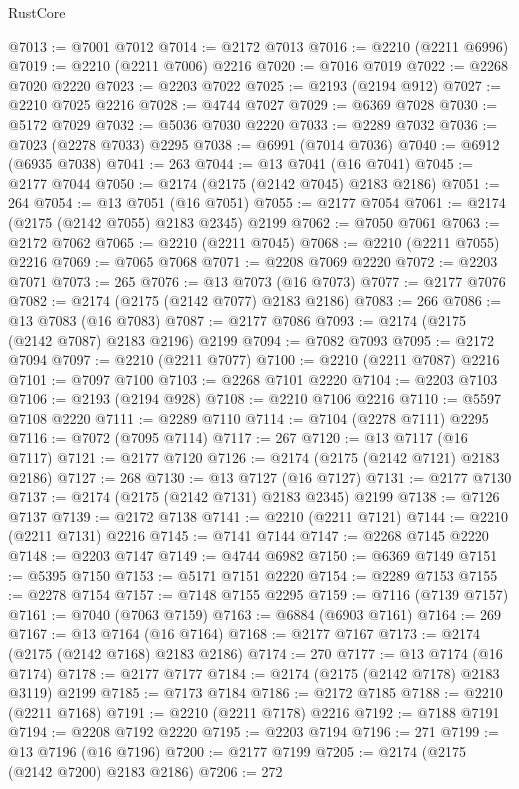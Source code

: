 \begin{lexlean}{RustCore}
\begin{coremodule}
@7013 := @7001 @7012
@7014 := @2172 @7013
@7016 := @2210 (@2211 @6996)
@7019 := @2210 (@2211 @7006) @2216
@7020 := @7016 @7019
@7022 := @2268 @7020 @2220
@7023 := @2203 @7022
@7025 := @2193 (@2194 @912)
@7027 := @2210 @7025 @2216
@7028 := @4744 @7027
@7029 := @6369 @7028
@7030 := @5172 @7029
@7032 := @5036 @7030 @2220
@7033 := @2289 @7032
@7036 := @7023 (@2278 @7033) @2295
@7038 := @6991 (@7014 @7036)
@7040 := @6912 (@6935 @7038)
@7041 := 263
@7044 := @13 @7041 (@16 @7041)
@7045 := @2177 @7044
@7050 := @2174 (@2175 (@2142 @7045) @2183 @2186)
@7051 := 264
@7054 := @13 @7051 (@16 @7051)
@7055 := @2177 @7054
@7061 := @2174 (@2175 (@2142 @7055) @2183 @2345) @2199
@7062 := @7050 @7061
@7063 := @2172 @7062
@7065 := @2210 (@2211 @7045)
@7068 := @2210 (@2211 @7055) @2216
@7069 := @7065 @7068
@7071 := @2208 @7069 @2220
@7072 := @2203 @7071
@7073 := 265
@7076 := @13 @7073 (@16 @7073)
@7077 := @2177 @7076
@7082 := @2174 (@2175 (@2142 @7077) @2183 @2186)
@7083 := 266
@7086 := @13 @7083 (@16 @7083)
@7087 := @2177 @7086
@7093 := @2174 (@2175 (@2142 @7087) @2183 @2196) @2199
@7094 := @7082 @7093
@7095 := @2172 @7094
@7097 := @2210 (@2211 @7077)
@7100 := @2210 (@2211 @7087) @2216
@7101 := @7097 @7100
@7103 := @2268 @7101 @2220
@7104 := @2203 @7103
@7106 := @2193 (@2194 @928)
@7108 := @2210 @7106 @2216
@7110 := @5597 @7108 @2220
@7111 := @2289 @7110
@7114 := @7104 (@2278 @7111) @2295
@7116 := @7072 (@7095 @7114)
@7117 := 267
@7120 := @13 @7117 (@16 @7117)
@7121 := @2177 @7120
@7126 := @2174 (@2175 (@2142 @7121) @2183 @2186)
@7127 := 268
@7130 := @13 @7127 (@16 @7127)
@7131 := @2177 @7130
@7137 := @2174 (@2175 (@2142 @7131) @2183 @2345) @2199
@7138 := @7126 @7137
@7139 := @2172 @7138
@7141 := @2210 (@2211 @7121)
@7144 := @2210 (@2211 @7131) @2216
@7145 := @7141 @7144
@7147 := @2268 @7145 @2220
@7148 := @2203 @7147
@7149 := @4744 @6982
@7150 := @6369 @7149
@7151 := @5395 @7150
@7153 := @5171 @7151 @2220
@7154 := @2289 @7153
@7155 := @2278 @7154
@7157 := @7148 @7155 @2295
@7159 := @7116 (@7139 @7157)
@7161 := @7040 (@7063 @7159)
@7163 := @6884 (@6903 @7161)
@7164 := 269
@7167 := @13 @7164 (@16 @7164)
@7168 := @2177 @7167
@7173 := @2174 (@2175 (@2142 @7168) @2183 @2186)
@7174 := 270
@7177 := @13 @7174 (@16 @7174)
@7178 := @2177 @7177
@7184 := @2174 (@2175 (@2142 @7178) @2183 @3119) @2199
@7185 := @7173 @7184
@7186 := @2172 @7185
@7188 := @2210 (@2211 @7168)
@7191 := @2210 (@2211 @7178) @2216
@7192 := @7188 @7191
@7194 := @2208 @7192 @2220
@7195 := @2203 @7194
@7196 := 271
@7199 := @13 @7196 (@16 @7196)
@7200 := @2177 @7199
@7205 := @2174 (@2175 (@2142 @7200) @2183 @2186)
@7206 := 272

\end{coremodule}
\end{lexlean}
